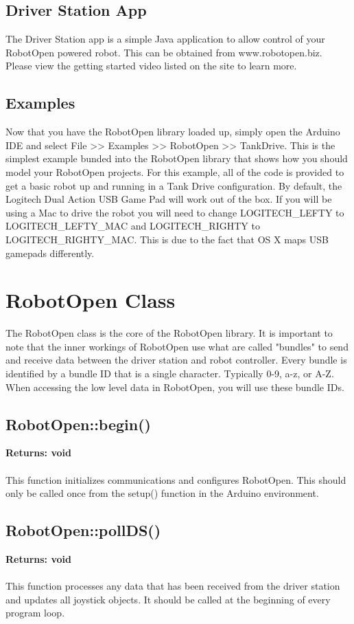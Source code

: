 \documentclass[11pt]{article} %
\begin{document}
\newpage

\subsection{Driver Station App}
The Driver Station app is a simple Java application to allow control of your RobotOpen powered robot. This can be obtained from www.robotopen.biz. Please view the getting started video listed on the site to learn more.

\subsection{Examples}
Now that you have the RobotOpen library loaded up, simply open the Arduino IDE and select File >> Examples >> RobotOpen >> TankDrive. This is the simplest example bunded into the RobotOpen library that shows how you should model your RobotOpen projects. For this example, all of the code is provided to get a basic robot up and running in a Tank Drive configuration. By default, the Logitech Dual Action USB Game Pad will work out of the box. If you will be using a Mac to drive the robot you will need to change LOGITECH\_LEFTY to LOGITECH\_LEFTY\_MAC and LOGITECH\_RIGHTY to LOGITECH\_RIGHTY\_MAC. This is due to the fact that OS X maps USB gamepads differently.

\newpage

\section{RobotOpen Class}

The RobotOpen class is the core of the RobotOpen library. It is important to note that the inner workings of RobotOpen use what are called "bundles" to send and receive data between the driver station and robot controller. Every bundle is identified by a bundle ID that is a single character. Typically 0-9, a-z, or A-Z. When accessing the low level data in RobotOpen, you will use these bundle IDs.

\subsection{RobotOpen::begin()}
\textbf{Returns: void}\\\\
This function initializes communications and configures RobotOpen. This should only be called once from the setup() function in the Arduino environment.
\subsection{RobotOpen::pollDS()}
\textbf{Returns: void}\\\\
This function processes any data that has been received from the driver station and updates all joystick objects. It should be called at the beginning of every program loop.
\end{document}
